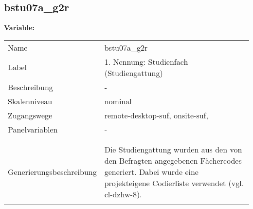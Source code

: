 	
	
	\subsection{bstu07a\_g2r}
	\label{subSection:bstu07a_g2r}

	\noindent\textbf{Variable:}\\
		\begin{tabular}{lL{11.3cm}}
			\label{tableVariable:bstu07a_g2r}
			Name & bstu07a\_g2r \\
			Label & 1. Nennung: Studienfach (Studiengattung) \\
			Beschreibung & - \\
			Skalenniveau & nominal \\
			Zugangswege &
				remote-desktop-suf,
				onsite-suf,
 \\
			Panelvariablen & -
			 \\
			 \\
 \\
					Generierungsbeschreibung & Die Studiengattung wurden aus den von den Befragten angegebenen Fächercodes generiert.  Dabei wurde eine projekteigene Codierliste verwendet (vgl. cl-dzhw-8).
				 \\	
			 \\
		\end{tabular}






